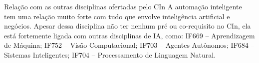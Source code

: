 \documentclass[a4paper,12pt]{article}
\begin{document}
	\begin{section}{Relação com as outras disciplinas ofertadas pelo CIn}
	A automação inteligente tem uma relação muito forte com tudo que envolve inteligência artificial e negócios. Apesar dessa disciplina não ter nenhum pré ou co-requisito no CIn, ela está fortemente ligada com outras disciplinas de IA, como: IF669 – Aprendizagem de Máquina; IF752 – Visão Computacional; IF703 – Agentes Autônomos;  IF684 – Sistemas Inteligentes; IF704 – Processamento de Linguagem Natural.
	\end{section}

		\clearpage
		
	
		
		
\end{document}
